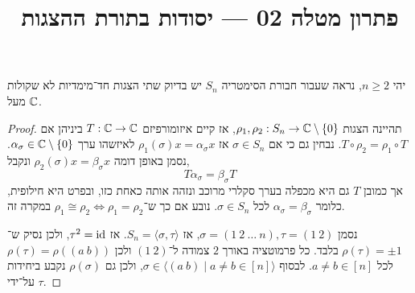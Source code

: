 
\title{פתרון מטלה 02 --- יסודות בתורת ההצגות}

\DeclareMathOperator\reg{reg}
\DeclareMathOperator\Ann{Ann}



\maketitle
\maketitleprint[red]

\question{}
יהי $n \ge 2$, נראה שעבור חבורת הסימטריה $S_n$ יש בדיוק שתי הצגות חד־מימדיות לא שקולות מעל $\mathbb{C}$.
\begin{proof}
	תהיינה הצגות $\rho_1, \rho_2 : S_n \to \mathbb{C} \setminus \{ 0 \}$, אז קיים איזומורפיזם $T : \mathbb{C} \to \mathbb{C}$ ביניהן אם $T \circ \rho_2 = \rho_1 \circ T$.
	נבחין גם כי אם $\sigma \in S_n$ אז $\rho_1(\sigma) x = \alpha_{\sigma} x$ לאיזשהו ערך $\alpha_{\sigma} \in \mathbb{C} \setminus \{ 0 \}$.
	נסמן באופן דומה $\rho_2(\sigma) x = \beta_{\sigma} x$ ונקבל,
	\[
		T \alpha_{\sigma}
		= \beta_{\sigma} T
	\]
	אך כמובן $T$ גם היא מכפלה בערך סקלרי מרוכב ונזהה אותה כאחת כזו, ובפרט היא חילופית, כלומר $\alpha_{\sigma} = \beta_{\sigma}$ לכל $\sigma \in S_n$.
	נובע אם כך ש־$\rho_1 \cong \rho_2 \iff \rho_1 = \rho_2$ במקרה זה.

	נסמן $\sigma = (1\ 2\ \ldots\ n), \tau = (1\ 2)$, אז $S_n = \langle \sigma, \tau \rangle$.
	אז $\tau^2 = \operatorname{id}$, ולכן נסיק ש־$\rho(\tau) = \pm 1$ בלבד.
	כל פרמוטציה באורך $2$ צמודה ל־$(1\ 2)$ ולכן $\rho(\tau) = \rho((a\ b))$ לכל $a \ne b \in [n]$.
	לבסוף $\sigma \in \langle (a\ b) \mid a \ne b \in [n] \rangle$, ולכן גם $\rho(\sigma)$ נקבע ביחידות על־ידי $\tau$.
\end{proof}

